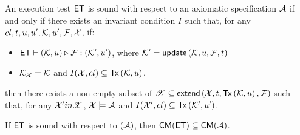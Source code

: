 \begin{definition}
\label{def:main-body-et_sound}
An execution test \(\mathsf{ET}\) is sound with respect to an axiomatic 
specification \(\mathcal{A}\) if and only if
there exists an invariant condition \(I\) such that, 
for any \({cl}, t, u, u', \mathcal{K}, u', \mathcal{F}, \mathcal{X}\), if:
\begin{itemize}
    \item \(\mathsf{ET} \vdash (\mathcal{K}, u) \triangleright_{} \mathcal{F}: (\mathcal{K}',u')\), where \( \mkvs' = \updateKV[\mkvs, \vi ,\fp, \txid]\)
    \item  \(\mathcal{K}_{\mathcal{X}} = \mathcal{K}\) and \(I(\aexec, \cl) \subseteq \Tx[\mkvs, \vi]\),
\end{itemize}
then there exists a non-empty subset of \(\mathscr{X} \subseteq \extend[\aexec, \txid, \Tx[\hh, \vi], \fp]\) 
such that, for any \(\mathcal{X}' in \mathscr{X}\), \(\mathcal{X} \models \mathcal{A}\) and \(I(\aexec', \cl) \subseteq \Tx[\mkvs', \vi']\).
\end{definition}

\begin{theorem}
\label{thm:main-body-et_soundness}
If \(\mathsf{ET}\) is sound with respect to \((\mathcal{A})\), then \(\CMs(\ET) \subseteq \CMs(\Ax)\).
\end{theorem}

